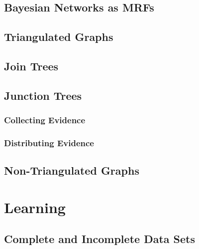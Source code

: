     \section{Bayesian Networks as MRFs} %

    \section{Triangulated Graphs} %

    \section{Join Trees} %

    \section{Junction Trees} %

        \subsection{Collecting Evidence} %

        \subsection{Distributing Evidence} %

    \section{Non-Triangulated Graphs} %

\chapter{Learning} %

    \section{Complete and Incomplete Data Sets} %

